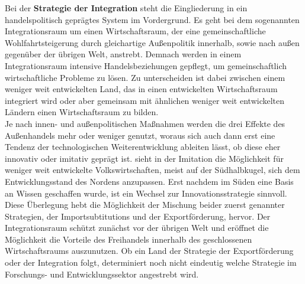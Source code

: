 Bei der \textbf{Strategie der Integration} steht die Eingliederung in ein handelspolitisch gepr{\"a}gtes System im Vordergrund. Es geht bei dem sogenannten Integrationsraum um einen Wirtschaftsraum, der eine gemeinschaftliche Wohlfahrtsteigerung durch gleichartige Au{\ss}enpolitik innerhalb, sowie nach au{\ss}en gegen{\"u}ber der {\"u}brigen Welt, anstrebt. Demnach werden in einem Integrationsraum intensive Handelsbeziehungen gepflegt, um gemeinschaftlich wirtschaftliche Probleme zu l{\"o}sen. Zu unterscheiden ist dabei zwischen einem weniger weit entwickelten Land, das in einen entwickelten Wirtschaftsraum integriert wird oder aber gemeinsam mit {\"a}hnlichen weniger weit entwickelten L{\"a}ndern einen Wirtschaftsraum zu bilden.\\
Je nach innen- und au{\ss}enpolitischen Ma{\ss}nahmen werden die drei Effekte des Au{\ss}enhandels mehr oder weniger genutzt, woraus sich auch dann erst eine Tendenz der technologischen Weiterentwicklung ableiten l{\"a}sst, ob diese eher innovativ oder imitativ gepr{\"a}gt ist. 
\citet{Glass.1999} sieht in der Imitation die M{\"o}glichkeit f{\"u}r weniger weit entwickelte Volkswirtschaften, meist auf der S{\"u}dhalbkugel, sich dem Entwicklungsstand des Nordens anzupassen. Erst nachdem im S{\"u}den eine Basis an Wissen geschaffen wurde, ist ein Wechsel zur Innovationsstrategie sinnvoll. \newline 
Diese {\"U}berlegung hebt die M{\"o}glichkeit der Mischung beider zuerst genannter Strategien, der Importsubtitutions und der Exportf{\"o}rderung, hervor. Der Integrationsraum sch{\"u}tzt zun{\"a}chst vor der {\"u}brigen Welt und er{\"o}ffnet die M{\"o}glichkeit die Vorteile des Freihandels innerhalb des geschlossenen Wirtschaftsraums auszunutzen. Ob ein Land der Strategie der Exportf{\"o}rderung oder der Integration folgt, determiniert noch nicht eindeutig welche Strategie im Forschungs- und Entwicklungssektor angestrebt wird.
\bigskip

